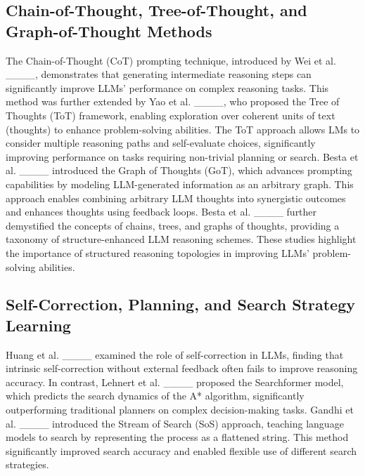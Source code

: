 \subsection{Chain-of-Thought, Tree-of-Thought, and Graph-of-Thought Methods}
The Chain-of-Thought (CoT) prompting technique, introduced by Wei et al. ____, demonstrates that generating intermediate reasoning steps can significantly improve LLMs' performance on complex reasoning tasks. This method was further extended by Yao et al. ____, who proposed the Tree of Thoughts (ToT) framework, enabling exploration over coherent units of text (thoughts) to enhance problem-solving abilities. The ToT approach allows LMs to consider multiple reasoning paths and self-evaluate choices, significantly improving performance on tasks requiring non-trivial planning or search. Besta et al. ____ introduced the Graph of Thoughts (GoT), which advances prompting capabilities by modeling LLM-generated information as an arbitrary graph. This approach enables combining arbitrary LLM thoughts into synergistic outcomes and enhances thoughts using feedback loops. Besta et al. ____ further demystified the concepts of chains, trees, and graphs of thoughts, providing a taxonomy of structure-enhanced LLM reasoning schemes. These studies highlight the importance of structured reasoning topologies in improving LLMs' problem-solving abilities.

\subsection{Self-Correction, Planning, and Search Strategy Learning}
Huang et al. ____ examined the role of self-correction in LLMs, finding that intrinsic self-correction without external feedback often fails to improve reasoning accuracy. In contrast, Lehnert et al. ____ proposed the Searchformer model, which predicts the search dynamics of the A* algorithm, significantly outperforming traditional planners on complex decision-making tasks. Gandhi et al. ____ introduced the Stream of Search (SoS) approach, teaching language models to search by representing the process as a flattened string. This method significantly improved search accuracy and enabled flexible use of different search strategies.